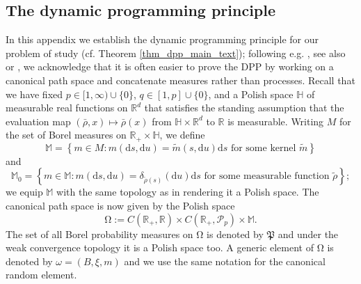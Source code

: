 \documentclass{article}
\theoremstyle{definition}
\numberwithin{equation}{section}
\numberwithin{theorem}{section}
\newcommand{\R}{\mathbb{R}}
\newcommand{\ds}{\mathrm{d}s}
\newcommand{\du}{\mathrm{d}u}
\newcommand{\Hb}{\mathbb{H}}
\newcommand{\Mb}{\mathbb{M}}
\newcommand{\Pc}{\mathcal{P}}
\newcommand{\Bc}{\mathcal{B}}
\def\comment#1{\marginpar{\raggedright\scriptsize{\textcolor{red}{#1}}}}
\newcommand{\red}{\color{red}}%
\newcommand{\Pk}{\mathfrak{P}}
\begin{document}
\begin{appendix}

\section{The dynamic programming principle}\label{app:DPP}
		
	
	In this appendix we establish the dynamic programming principle for our problem of study (cf. Theorem \ref{thm_dpp_main_text}); following e.g. \cite{karoui2013_1,karoui2013_2,zitkovic2014}, see also \cite{nutz2013} or \cite{neufeld2013}, we acknowledge that it is often easier to prove the DPP by working on a canonical path space and concatenate measures rather than processes.
	Recall that we have fixed $p \in [1,\infty) \cup \{0\}$, $q \in [1,p] \cup \{0\}$, and a Polish space $\Hb$ of measurable real functions on $\R^d$ that satisfies the standing assumption that the evaluation map $(\bar\rho,x) \mapsto \bar\rho(x)$ from $\Hb \times \R^d$ to $\R$ is measurable. 
	Writing $M$ for the set of Borel measures on $\R_+\times\Hb$, we define
	\[
		\Mb=\left\{m\in M \colon \textrm{$m(\ds,\du)=\tilde m(s,\du)\ds$ for some kernel $\tilde m$}\right\}
	\]
	and 
	\[
	\Mb_0=\left\{m\in\Mb:m(\ds,\du)=\delta_{\tilde\rho(s)}(\du)\ds\textrm{ for some measurable function $\tilde\rho$}\right\};
	\]
	we equip $\Mb$ with the same topology as in \cite[Remark~1.4]{karoui2013_2} rendering it a Polish space.
	The canonical path space is now given by the Polish space
	\begin{equation*}
		{\mathrm{\Omega}}:= C(\R_+,\R)\times C(\R_+,\Pc_p)\times\Mb.
	\end{equation*}
	The set of all Borel probability measures on ${\mathrm{\Omega}}$ is denoted by $\Pk$ and under the weak convergence topology it is a Polish space too. 
	A generic element of $\mathrm{\Omega}$ is denoted by $\omega=(B,\xi,m)$ and we use the same notation for the canonical random element.

\end{appendix}
\end{document}
